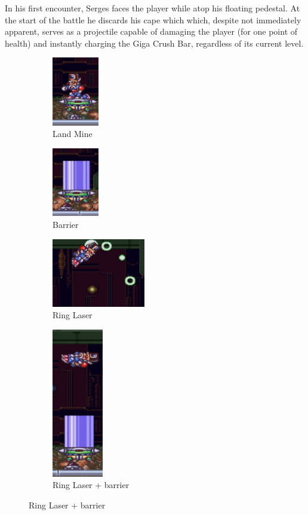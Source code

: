 In his first encounter, Serges faces the player while atop his floating pedestal. At the start of the battle he discards his cape which which, despite not immediately apparent, serves as a projectile capable of damaging the player (for one point of health) and instantly charging the Giga Crush Bar, regardless of its current level.
 \begin{figure}[htp]
	\centering
	\begin{minipage}{.45\linewidth}
		\centering
		\begin{subfigure}[t]{0.4\linewidth}
			\centering
			\includegraphics[height=3cm]{figures/X2/Hunter_stages/Serges_mines.png}
			\caption{Land Mine}	
		\end{subfigure}
		\begin{subfigure}[t]{0.4\linewidth}
			\centering
			\includegraphics[height=3cm]{figures/X2/Hunter_stages/Serges_barrier.png}
			\caption{Barrier}
		\end{subfigure}
		\begin{subfigure}{\linewidth}
			\centering
			\includegraphics[height=3cm]{figures/X2/Hunter_stages/Serges_beams.png}
			\caption{Ring Laser}
		\end{subfigure}
	\end{minipage}
	\begin{minipage}{.3\linewidth}		
		\centering
		\begin{subfigure}[t]{\linewidth}
			\centering
			\includegraphics[height=6.5cm]{figures/X2/Hunter_stages/Serges_barrier_jump.png}
			\caption{Ring Laser + barrier}
		\end{subfigure}
	\end{minipage}
\end{figure}
